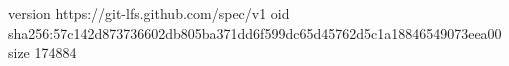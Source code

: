 version https://git-lfs.github.com/spec/v1
oid sha256:57c142d873736602db805ba371dd6f599dc65d45762d5c1a18846549073eea00
size 174884
